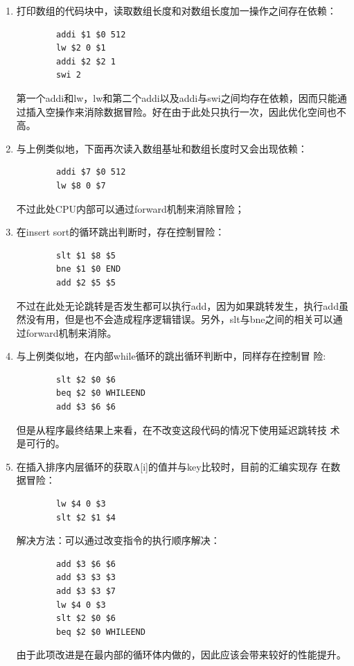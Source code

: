 \documentclass[a4paper,dvipdfm]{ctexart}
\begin{document}
\begin{enumerate}
\item 打印数组的代码块中，读取数组长度和对数组长度加一操作之间存在依赖：
\begin{lstlisting}
        addi $1 $0 512
        lw $2 0 $1
        addi $2 $2 1
        swi 2
\end{lstlisting}
  第一个addi和lw，lw和第二个addi以及addi与swi之间均存在依赖，因而只能通
  过插入空操作来消除数据冒险。好在由于此处只执行一次，因此优化空间也不
  高。
\item 与上例类似地，下面再次读入数组基址和数组长度时又会出现依赖：
\begin{lstlisting}
        addi $7 $0 512
        lw $8 0 $7
\end{lstlisting}
  不过此处CPU内部可以通过forward机制来消除冒险；
\item 在insert sort的循环跳出判断时，存在控制冒险：
\begin{lstlisting}
        slt $1 $8 $5
        bne $1 $0 END
        add $2 $5 $5
\end{lstlisting}
  不过在此处无论跳转是否发生都可以执行add，因为如果跳转发生，执行add虽
  然没有用，但是也不会造成程序逻辑错误。另外，slt与bne之间的相关可以通
  过forward机制来消除。
\item 与上例类似地，在内部while循环的跳出循环判断中，同样存在控制冒
  险:
\begin{lstlisting}
        slt $2 $0 $6
        beq $2 $0 WHILEEND
        add $3 $6 $6
\end{lstlisting}
  但是从程序最终结果上来看，在不改变这段代码的情况下使用延迟跳转技
  术是可行的。
\item 在插入排序内层循环的获取A[i]的值并与key比较时，目前的汇编实现存
  在数据冒险：
\begin{lstlisting}
        lw $4 0 $3
        slt $2 $1 $4
\end{lstlisting}
解决方法：可以通过改变指令的执行顺序解决：
\begin{lstlisting}
        add $3 $6 $6
        add $3 $3 $3
        add $3 $3 $7
        lw $4 0 $3
        slt $2 $0 $6
        beq $2 $0 WHILEEND
\end{lstlisting}
由于此项改进是在最内部的循环体内做的，因此应该会带来较好的性能提升。
\end{enumerate}


\appendix{}



\end{document}

